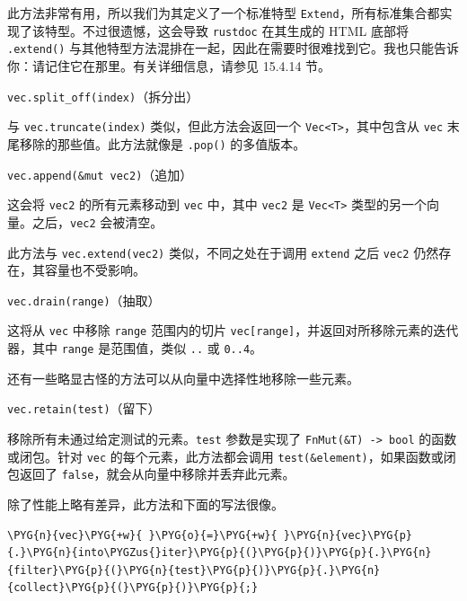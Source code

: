 此方法非常有用，所以我们为其定义了一个标准特型 \texttt{Extend}，所有标准集合都实现了该特型。不过很遗憾，这会导致 \texttt{rustdoc} 在其生成的 HTML 底部将 \texttt{.extend()} 与其他特型方法混排在一起，因此在需要时很难找到它。我也只能告诉你：请记住它在那里。有关详细信息，请参见 15.4.14 节。

\begin{mySidenote}
\texttt{vec.split\_off(index)}（拆分出）
\end{mySidenote}

与 \texttt{vec.truncate(index)} 类似，但此方法会返回一个 \texttt{Vec<T>}，其中包含从 \texttt{vec} 末尾移除的那些值。此方法就像是 \texttt{.pop()} 的多值版本。

\begin{mySidenote}
\texttt{vec.append(\&mut vec2)}（追加）
\end{mySidenote}

这会将 \texttt{vec2} 的所有元素移动到 \texttt{vec} 中，其中 \texttt{vec2} 是 \texttt{Vec<T>} 类型的另一个向量。之后，\texttt{vec2} 会被清空。

此方法与 \texttt{vec.extend(vec2)} 类似，不同之处在于调用 \texttt{extend} 之后 \texttt{vec2} 仍然存在，其容量也不受影响。

\begin{mySidenote}
\texttt{vec.drain(range)}（抽取）
\end{mySidenote}

这将从 \texttt{vec} 中移除 \texttt{range} 范围内的切片 \texttt{vec[range]}，并返回对所移除元素的迭代器，其中 \texttt{range} 是范围值，类似 \texttt{..} 或 \texttt{0..4}。

还有一些略显古怪的方法可以从向量中选择性地移除一些元素。

\begin{mySidenote}
\texttt{vec.retain(test)}（留下）
\end{mySidenote}

移除所有未通过给定测试的元素。\texttt{test} 参数是实现了 \texttt{FnMut(\&T) -> bool} 的函数或闭包。针对 \texttt{vec} 的每个元素，此方法都会调用 \texttt{test(\&element)}，如果函数或闭包返回了 \texttt{false}，就会从向量中移除并丢弃此元素。

除了性能上略有差异，此方法和下面的写法很像。

\begin{Verbatim}[commandchars=\\\{\},breaklines=true,breakanywhere=true,fontsize=\codefont,xleftmargin=17bp]
\PYG{n}{vec}\PYG{+w}{ }\PYG{o}{=}\PYG{+w}{ }\PYG{n}{vec}\PYG{p}{.}\PYG{n}{into\PYGZus{}iter}\PYG{p}{(}\PYG{p}{)}\PYG{p}{.}\PYG{n}{filter}\PYG{p}{(}\PYG{n}{test}\PYG{p}{)}\PYG{p}{.}\PYG{n}{collect}\PYG{p}{(}\PYG{p}{)}\PYG{p}{;}
\end{Verbatim}

